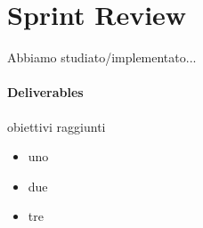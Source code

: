 \section{Sprint Review}
Abbiamo studiato/implementato...
\paragraph{Deliverables} 
obiettivi raggiunti
\begin{itemize}
    \item uno
    \item due
    \item tre
\end{itemize}
